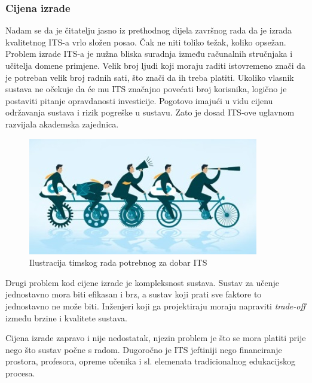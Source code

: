 \documentclass[times, utf8, zavrsni, numeric]{fer}
\begin{document}
\subsubsection{Cijena izrade}
Nadam se da je čitatelju jasno iz prethodnog dijela završnog rada da je izrada kvalitetnog ITS-a vrlo složen posao. Čak ne niti toliko težak, koliko opsežan. Problem izrade ITS-a je nužna bliska suradnja između računalnih stručnjaka i učitelja domene primjene. Velik broj ljudi koji moraju raditi istovremeno znači da je potreban velik broj radnih sati, što znači da ih treba platiti. Ukoliko vlasnik sustava ne očekuje da će mu ITS značajno povećati broj korisnika, logično je postaviti pitanje opravdanosti investicije. Pogotovo imajući u vidu cijenu održavanja sustava i rizik pogreške u sustavu. Zato je dosad ITS-ove uglavnom razvijala akademska zajednica.

\begin{figure}[htb]
	\centering
	\includegraphics[]{img/teamwork.jpg}
	\caption{Ilustracija timskog rada potrebnog za dobar ITS\cite{teamwork}}
	\label{fig:teamwork}
\end{figure}

\par
Drugi problem kod cijene izrade je kompleksnost sustava. Sustav za učenje jednostavno mora biti efikasan i brz, a sustav koji prati sve faktore to jednostavno ne može biti. Inženjeri koji ga projektiraju moraju napraviti \textit{trade-off} između brzine i kvalitete sustava.
\par
Cijena izrade zapravo i nije nedostatak, njezin problem je što se mora platiti prije nego što sustav počne s radom. Dugoročno je ITS jeftiniji nego financiranje prostora, profesora, opreme učenika i sl. elemenata tradicionalnog edukacijskog procesa.\cite{limitations}
\end{document}

